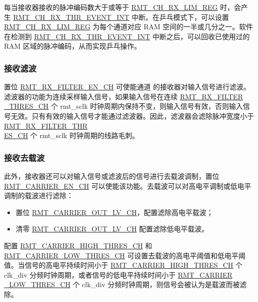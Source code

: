 \documentclass[main\_\_CN.tex]{subfiles}
\begin{document}
每当接收器接收的脉冲编码数大于或等于 \hyperref[fielddesc:RMTCHMRXLIMREG]{RMT\_CH\_RX\_LIM\_REG} 时，会产生
\hyperref[int:RMTCHmRXTHREVENTINT]{RMT\_CH\_RX\_THR\_EVENT\_INT} 中断。在乒乓模式下，可以设置 \hyperref[fielddesc:RMTCHMRXLIMREG]{RMT\_CH\_RX\_LIM\_REG}
为每个通道对应 RAM 空间的一半或几分之一。软件在检测到 \hyperref[int:RMTCHmRXTHREVENTINT]{RMT\_CH\_RX\_THR\_EVENT\_INT}
中断之后，可以回收已使用过的 RAM 区域的脉冲编码，从而实现乒乓操作。




\subsubsection{接收滤波}

置位 \hyperref[fielddesc:RMTRXFILTERENCHM]{RMT\_RX\_FILTER\_EN\_CH} 可使能通道  的接收器对输入信号进行滤波。滤波器的功能为连续采样输入信号，如果输入信号在连续 \hyperref[fielddesc:RMTRXFILTERTHRESCHM]{RMT\_RX\_FILTER \_THRES\_CH} 个 rmt\_sclk 时钟周期内保持不变，则输入信号有效，否则输入信号无效。只有有效的输入信号才能通过滤波器。因此，滤波器会滤除脉冲宽度小于 \hyperref[fielddesc:RMTRXFILTERTHRESCHM]{RMT\_RX\_FILTER\_THR\\ES\_CH} 个 rmt\_sclk 时钟周期的线路毛刺。

\subsubsection{接收去载波}

此外，接收器还可以对输入信号或滤波后的信号进行去载波调制，置位 \hyperref[fielddesc:RMTCARRIERENCHM]{RMT\_CARRIER\_EN\_CH} 可以使能该功能。去载波可以对高电平调制或低电平调制的载波进行滤除：
\begin{itemize}
    \item 置位 \hyperref[fielddesc:RMTCARRIEROUTLVCHM]{RMT\_CARRIER\_OUT\_LV\_CH}，配置滤除高电平载波；
    \item 清零 \hyperref[fielddesc:RMTCARRIEROUTLVCHM]{RMT\_CARRIER\_OUT\_LV\_CH} 配置滤除低电平载波。
\end{itemize}



配置 \hyperref[fielddesc:RMTCARRIERHIGHTHRESCHM]{RMT\_CARRIER\_HIGH\_THRES\_CH} 和 \hyperref[fielddesc:RMTCARRIERLOWTHRESCHM]{RMT\_CARRIER\_LOW\_THRES\_CH} 可设置去载波的高电平阈值和低电平阈值。当信号的高电平持续时间小于 \hyperref[fielddesc:RMTCARRIERHIGHTHRESCHM]{RMT\_CARRIER\_HIGH\_THRES\_CH} 个 clk\_div 分频时钟周期，或者信号的低电平持续时间小于 \hyperref[fielddesc:RMTCARRIERLOWTHRESCHM]{RMT\_CARRIER \_LOW\_THRES\_CH} 个 clk\_div 分频时钟周期，则信号会被认为是载波而被滤除。
\end{document}

